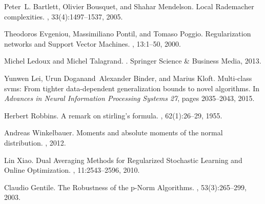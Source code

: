 \documentclass[10pt]{llncs}
\begin{document}
%
%
\begin{thebibliography}{1}
\providecommand{\url}[1]{\texttt{#1}}
\providecommand{\urlprefix}{URL }
Peter~L. Bartlett, Olivier Bousquet, and Shahar Mendelson.
\newblock Local {R}ademacher complexities.
, 33(4):1497--1537, 2005.

Theodoros Evgeniou, Massimiliano Pontil, and Tomaso Poggio.
\newblock Regularization networks and {S}upport {V}ector {M}achines.
, 13:1--50, 2000.

Michel Ledoux and Michel Talagrand.
.
\newblock Springer Science \& Business Media, 2013.

Yunwen Lei, Urun Doganand~Alexander Binder, and Marius Kloft.
\newblock Multi-class svms: From tighter data-dependent generalization bounds
  to novel algorithms.
\newblock In {\em Advances in Neural Information Processing Systems 27}, pages
  2035--2043, 2015.

Herbert Robbins.
\newblock A remark on stirling's formula.
, 62(1):26--29, 1955.

Andreas Winkelbauer.
\newblock Moments and absolute moments of the normal distribution.
, 2012.

Lin Xiao.
\newblock Dual Averaging Methods for Regularized Stochastic Learning and Online Optimization.
, 11:2543--2596, 2010.

Claudio Gentile.
\newblock The Robustness of the p-Norm Algorithms.
, 53(3):265--299, 2003.


\end{thebibliography}
\end{document}
